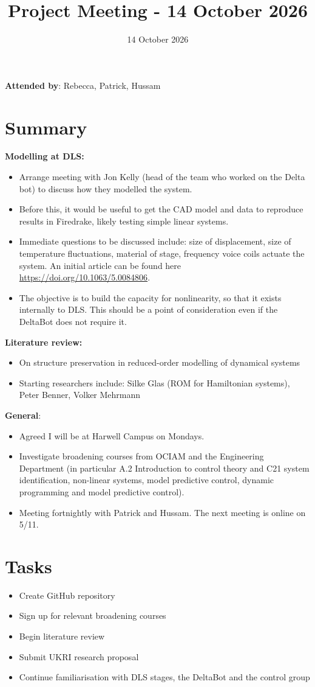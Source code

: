 \documentclass{article}
\title{Project Meeting - 14 October 2026}
\date{14 October 2026}
\begin{document}
\maketitle

\textbf{Attended by}: Rebecca, Patrick, Hussam

\section{Summary}
\textbf{Modelling at DLS:}
\begin{itemize}
    \item Arrange meeting with Jon Kelly (head of the team who worked on the Delta bot) to discuss how they modelled the system. 
    \item Before this, it would be useful to get the CAD model and data to reproduce results in Firedrake, likely testing simple linear systems. 
    \item Immediate questions to be discussed include: size of displacement, size of temperature fluctuations, material of stage, frequency voice coils actuate the system. An initial article can be found here \url{https://doi.org/10.1063/5.0084806}.
    \item The objective is to build the capacity for nonlinearity, so that it exists internally to DLS. This should be a point of consideration even if the DeltaBot does not require it.
\end{itemize}
\textbf{Literature review:}
\begin{itemize}
    \item On structure preservation in reduced-order modelling of dynamical systems
    \item Starting researchers include: Silke Glas (ROM for Hamiltonian systems), Peter Benner, Volker Mehrmann
\end{itemize}
\textbf{General}:
\begin{itemize}
    \item Agreed I will be at Harwell Campus on Mondays.
    \item Investigate broadening courses from OCIAM and the Engineering Department (in particular A.2 Introduction to control theory and C21 system identification, non-linear systems, model predictive control, dynamic programming and model predictive control).
    \item Meeting fortnightly with Patrick and Hussam. The next meeting is online on 5/11.
\end{itemize}

\section{Tasks}
\begin{itemize}
    \item Create GitHub repository
    \item Sign up for relevant broadening courses
    \item Begin literature review
    \item Submit UKRI research proposal
    \item Continue familiarisation with DLS stages, the DeltaBot and the control group
\end{itemize}
\end{document}
